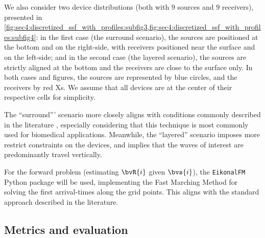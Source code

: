 We also consider two device distributions (both with $9$ sources and $9$ receivers), presented in \cref{fig:sec4:discretized_ssf_with_profiles:subfig3,fig:sec4:discretized_ssf_with_profiles:subfig4}: in the first case (the surround scenario), the sources are positioned at the bottom and on the right-side, with receivers positioned near the surface and on the left-side; and in the second case (the layered scenario), the sources are strictly aligned at the bottom and the receivers are close to the surface only. In both cases and figures, the sources are represented by blue circles, and the receivers by red Xs. We assume that all devices are at the center of their respective cells for simplicity.

The ``surround''' scenario more closely aligns with conditions commonly described in the literature \cite{ali_opensource_2019,holstein_acoustic_2004,hormati_robust_2010,jeong_investigating_2024}, especially considering that this technique is most commonly used for biomedical applications. 
Meanwhile, the ``layered'' scenario imposes more restrict constraints on the devices, and implies that the waves of interest are predominantly travel vertically.

For the forward problem (estimating $\bvR{i}$ given $\bvs{i}$), the \texttt{EikonalFM} Python package \cite{ganster_eikonalfm_2025} will be used, implementing the Fast Marching Method \cite{tang_travel_2024} for solving the first arrival-times along the grid points. This aligns with the standard approach described in the literature.

\subsection{Metrics and evaluation}

